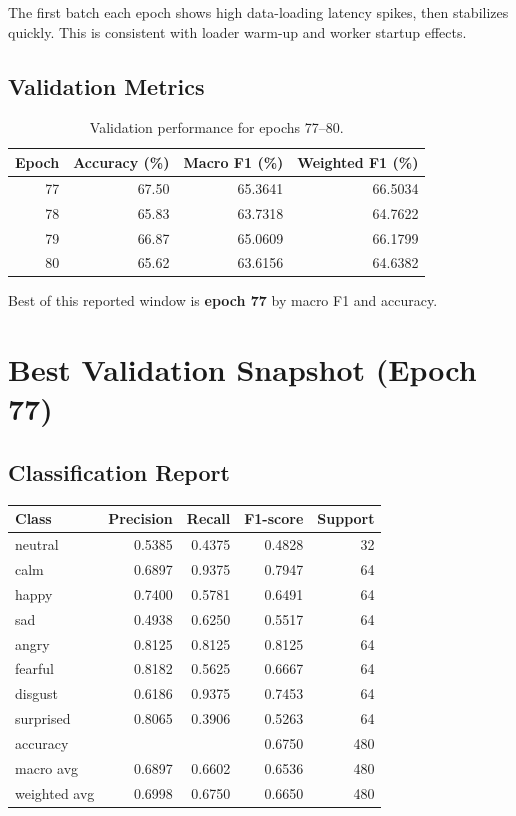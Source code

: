 \documentclass[11pt]{article}
\begin{document}
The first batch each epoch shows high data-loading latency spikes, then stabilizes quickly. This is consistent with loader warm-up and worker startup effects.

\subsection{Validation Metrics}
\begin{table}[H]
\centering
\begin{tabular}{rrrr}
\toprule
Epoch & Accuracy (\%) & Macro F1 (\%) & Weighted F1 (\%) \\
\midrule
77 & 67.50 & 65.3641 & 66.5034 \\
78 & 65.83 & 63.7318 & 64.7622 \\
79 & 66.87 & 65.0609 & 66.1799 \\
80 & 65.62 & 63.6156 & 64.6382 \\
\bottomrule
\end{tabular}
\caption{Validation performance for epochs 77--80.}
\end{table}

Best of this reported window is \textbf{epoch 77} by macro F1 and accuracy.

\section{Best Validation Snapshot (Epoch 77)}
\subsection{Classification Report}
\begin{center}
\begin{tabular}{lrrrr}
\toprule
Class & Precision & Recall & F1-score & Support \\
\midrule
neutral   & 0.5385 & 0.4375 & 0.4828 & 32 \\
calm      & 0.6897 & 0.9375 & 0.7947 & 64 \\
happy     & 0.7400 & 0.5781 & 0.6491 & 64 \\
sad       & 0.4938 & 0.6250 & 0.5517 & 64 \\
angry     & 0.8125 & 0.8125 & 0.8125 & 64 \\
fearful   & 0.8182 & 0.5625 & 0.6667 & 64 \\
disgust   & 0.6186 & 0.9375 & 0.7453 & 64 \\
surprised & 0.8065 & 0.3906 & 0.5263 & 64 \\
\midrule
accuracy      & \multicolumn{3}{r}{0.6750} & 480 \\
macro avg     & 0.6897 & 0.6602 & 0.6536 & 480 \\
weighted avg  & 0.6998 & 0.6750 & 0.6650 & 480 \\
\bottomrule
\end{tabular}
\end{center}
\end{document}
